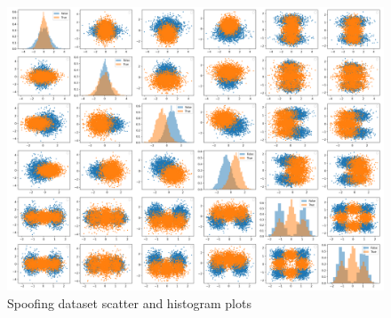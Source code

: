 \begin{figure}[htbp]
    \centering
    \includegraphics[width=0.9\linewidth]{lab02/original_data_scatter_matrix.png} %
    \caption{Spoofing dataset scatter and histogram plots}
    \label{fig:original_scatter}
\end{figure}
